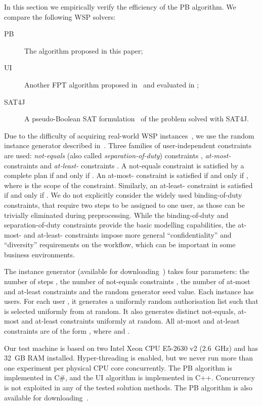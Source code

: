 \documentclass[runningheads,proof]{llncs}
\begin{document}
In this section we empirically verify the efficiency of the PB algorithm.  We compare the following WSP solvers:
\begin{description}
	\item[PB] The algorithm proposed in this paper;
	\item[UI] Another FPT algorithm proposed in~\cite{CoCrGaGuJo13} and evaluated in \cite{FAW2014,JOCO2014};
	\item[SAT4J] A pseudo-Boolean SAT formulation~\cite{FAW2014,JOCO2014} of the problem solved with SAT4J.
\end{description}

Due to the difficulty of acquiring real-world WSP instances~\cite{FAW2014,WaLi10}, we use the random instance generator described in~\cite{FAW2014}.
Three families of user-independent constraints are used: \emph{not-equals} (also called \emph{separation-of-duty}) constraints \mbox{}, \emph{at-most-} constraints  and \emph{at-least-} constraints .
A not-equals constraint  is satisfied by a complete plan  if and only if .
An at-most- constraint  is satisfied if and only if , where  is the scope of the constraint.
Similarly, an at-least- constraint  is satisfied if and only if .
We do not explicitly consider the widely used binding-of-duty constraints, that require two steps to be assigned to one user, as those can be trivially eliminated during preprocessing.
While the binding-of-duty and separation-of-duty constraints provide the basic modelling capabilities, the at-most- and at-least- constraints impose more general ``confidentiality'' and ``diversity'' requirements on the workflow, which can be important in some business environments.

The instance generator (available for downloading~\cite{SourceCodes}) takes four parameters: the number of steps , the number of not-equals constraints , the number of at-most and at-least constraints  and the random generator seed value.
Each instance has  users.  
For each user , it generates a uniformly random authorisation list  such that  is selected uniformly from  at random.  
It also generates  distinct not-equals,  at-most and  at-least constraints uniformly at random.
All at-most and at-least constraints are of the form , where  and .

Our test machine is based on two Intel Xeon CPU E5-2630 v2 (2.6~GHz) and has 32~GB RAM installed.  
Hyper-threading is enabled, but we never run more than one experiment per physical CPU core concurrently.  
The PB algorithm is implemented in C\#, and the UI algorithm is implemented in C++.  
Concurrency is not exploited in any of the tested solution methods.
The PB algorithm is also available for downloading~\cite{SourceCodes}.
\end{document}
